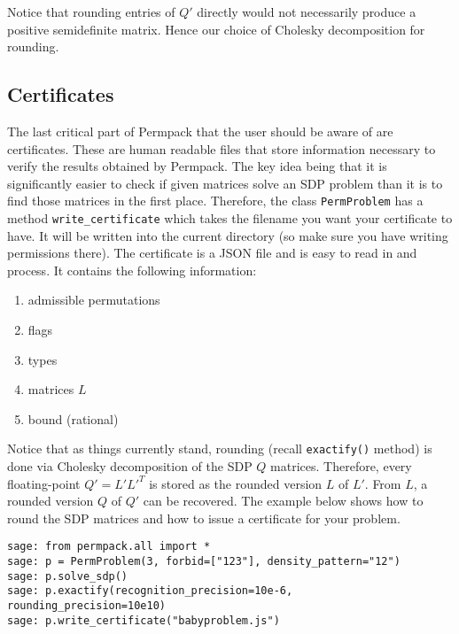 Notice that rounding entries of $Q'$ directly would not necessarily produce a positive semidefinite matrix. Hence our choice of Cholesky decomposition for rounding.

\subsection{Certificates}
\label{subsec:certificates}
The last critical part of Permpack that the user should be aware of are certificates. These are human readable files that store information necessary to verify the results obtained by Permpack. The key idea being that it is significantly easier to check if given matrices solve an SDP problem than it is to find those matrices in the first place. Therefore, the class \texttt{PermProblem} has a method \texttt{write\_certificate} which takes the filename you want your certificate to have. It will be written into the current directory (so make sure you have writing permissions there). The certificate is a JSON file and is easy to read in and process. It contains the following information:

\begin{enumerate}
\item admissible permutations
\item flags
\item types
\item matrices $L$
\item bound (rational)
\end{enumerate}

Notice that as things currently stand, rounding (recall \texttt{exactify()} method) is done via Cholesky decomposition of the SDP $Q$ matrices. Therefore, every floating-point $Q' = L'L'^T$ is stored as the rounded version $L$ of $L'$. From $L$, a rounded version $Q$ of $Q'$ can be recovered. The example below shows how to round the SDP matrices and how to issue a certificate for your problem.

 {}
\begin{lstlisting}
sage: from permpack.all import *
sage: p = PermProblem(3, forbid=["123"], density_pattern="12")
sage: p.solve_sdp()
sage: p.exactify(recognition_precision=10e-6, rounding_precision=10e10)
sage: p.write_certificate("babyproblem.js")
\end{lstlisting}

